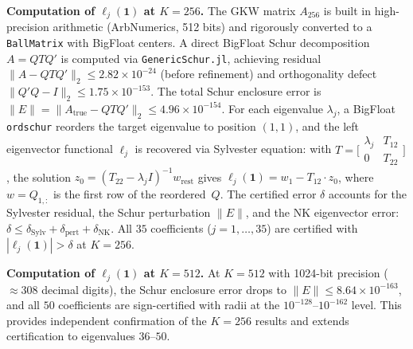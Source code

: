 \documentclass[11pt]{article}
\begin{document}
\medskip\noindent
\textbf{Computation of $\ell_j(\mathbf{1})$ at $K = 256$.}
The GKW matrix $A_{256}$ is built in high-precision arithmetic (ArbNumerics, 512 bits)
and rigorously converted to a \texttt{BallMatrix} with BigFloat centers.
A direct BigFloat Schur decomposition $A = Q T Q'$ is computed via
\texttt{GenericSchur.jl}, achieving residual $\|A - QTQ'\|_2 \leq 2.82 \times 10^{-24}$
(before refinement) and orthogonality defect $\|Q'Q - I\|_2 \leq 1.75 \times 10^{-153}$.
The total Schur enclosure error is
$\|E\| = \|A_{\mathrm{true}} - QTQ'\|_2 \leq 4.96 \times 10^{-154}$.
For each eigenvalue $\lambda_j$, a BigFloat \texttt{ordschur} reorders the target eigenvalue
to position $(1,1)$, and the left eigenvector functional $\ell_j$ is recovered
via Sylvester equation: with $T = \bigl[\begin{smallmatrix} \lambda_j & T_{12} \\ 0 & T_{22}\end{smallmatrix}\bigr]$,
the solution $z_0 = (T_{22} - \lambda_j I)^{-1} w_{\mathrm{rest}}$ gives
$\ell_j(\mathbf{1}) = w_1 - T_{12} \cdot z_0$,
where $w = Q_{1,:}$ is the first row of the reordered~$Q$.
The certified error $\delta$ accounts for the Sylvester residual,
the Schur perturbation $\|E\|$, and the NK eigenvector error:
$\delta \leq \delta_{\mathrm{Sylv}} + \delta_{\mathrm{pert}} + \delta_{\mathrm{NK}}$.
All $35$ coefficients ($j = 1, \ldots, 35$) are certified with $|\ell_j(\mathbf{1})| > \delta$
at $K = 256$.

\medskip\noindent
\textbf{Computation of $\ell_j(\mathbf{1})$ at $K = 512$.}
At $K = 512$ with 1024-bit precision ($\approx 308$ decimal digits),
the Schur enclosure error drops to
$\|E\| \leq 8.64 \times 10^{-163}$,
and all $50$ coefficients are sign-certified with radii at the $10^{-128}$--$10^{-162}$ level.
This provides independent confirmation of the $K = 256$ results and extends
certification to eigenvalues $36$--$50$.
\end{document}
